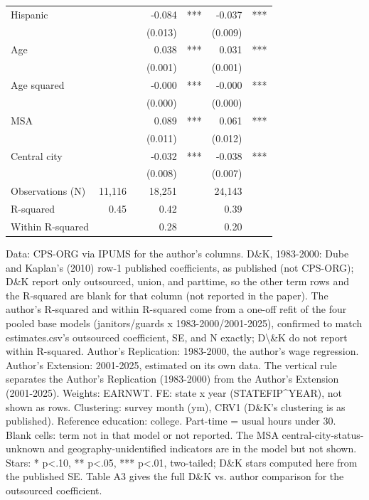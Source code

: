 \begin{table}[!t]
\begin{tabular}{l|rlrl|rl}
Hispanic &  &  & -0.084 & *** & -0.037 & *** \\
 &  &  & (0.013) &  & (0.009) &  \\
Age &  &  & 0.038 & *** & 0.031 & *** \\
 &  &  & (0.001) &  & (0.001) &  \\
Age squared &  &  & -0.000 & *** & -0.000 & *** \\
 &  &  & (0.000) &  & (0.000) &  \\
MSA &  &  & 0.089 & *** & 0.061 & *** \\
 &  &  & (0.011) &  & (0.012) &  \\
Central city &  &  & -0.032 & *** & -0.038 & *** \\
 &  &  & (0.008) &  & (0.007) &  \\
Observations (N) & 11,116 &  & 18,251 &  & 24,143 &  \\
R-squared & 0.45 &  & 0.42 &  & 0.39 &  \\
Within R-squared &  &  & 0.28 &  & 0.20 &  \\
\bottomrule
\end{tabular}\par\raggedright
\begin{minipage}{\linewidth}
Data: CPS-ORG via IPUMS for the author's columns. D\&K, 1983-2000: Dube and Kaplan's (2010) row-1 published coefficients, as published (not CPS-ORG); D\&K report only outsourced, union, and parttime, so the other term rows and the R-squared are blank for that column (not reported in the paper). The author's R-squared and within R-squared come from a one-off refit of the four pooled base models (janitors/guards x 1983-2000/2001-2025), confirmed to match estimates.csv's outsourced coefficient, SE, and N exactly; D\textbackslash{}\&K do not report within R-squared. Author's Replication: 1983-2000, the author's wage regression. Author's Extension: 2001-2025, estimated on its own data. The vertical rule separates the Author's Replication (1983-2000) from the Author's Extension (2001-2025). Weights: EARNWT. FE: state x year (STATEFIP\textasciicircum{}YEAR), not shown as rows. Clustering: survey month (ym), CRV1 (D\&K's clustering is as published). Reference education: college. Part-time = usual hours under 30. Blank cells: term not in that model or not reported. The MSA central-city-status-unknown and geography-unidentified indicators are in the model but not shown. Stars: * p<.10, ** p<.05, *** p<.01, two-tailed; D\&K stars computed here from the published SE. Table A3 gives the full D\&K vs. author comparison for the outsourced coefficient.\\
\end{minipage}
\end{table}
